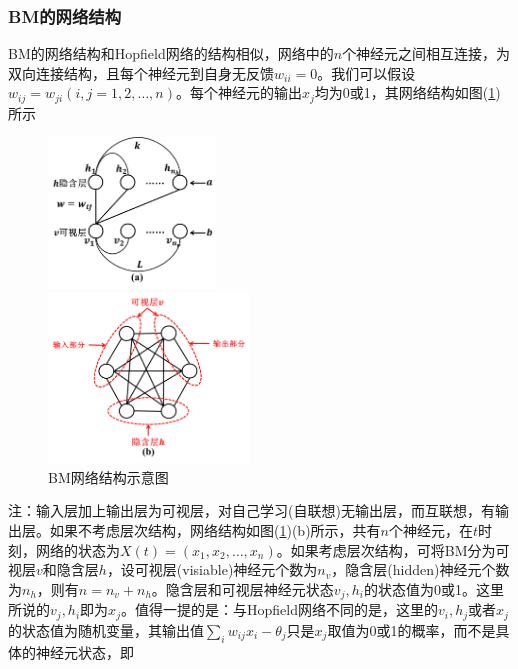 {        \subsubsection{BM的网络结构}
            \par
            BM的网络结构和Hopfield网络的结构相似，网络中的$n$个神经元之间相互连接，为双向连接结构，且每个神经元到自身无反馈$w_{ii} = 0$。我们可以假设$w_{ij} = w_{ji}(i,j=1,2,\dots,n)$。每个神经元的输出$x_j$均为0或1，其网络结构如图(\ref{fig:BM网络结构示意图})所示
			\begin{figure}[H]
  			\centering
  			\begin{varwidth}[t]{\textwidth}
    			\vspace{0pt}
    			\includegraphics[height=4cm]{images/BM_network_structure1.jpg}
  			\end{varwidth}
  			\qquad
  			\begin{varwidth}[t]{\textwidth}
    			\vspace{0pt}
    			\includegraphics[height=4.5cm]{images/BM_network_structure2.jpg}
  			\end{varwidth}
            \caption{BM网络结构示意图}
            \label{fig:BM网络结构示意图}
            \end{figure}
            注：输入层加上输出层为可视层，对自己学习(自联想)无输出层，而互联想，有输出层。如果不考虑层次结构，网络结构如图(\ref{fig:BM网络结构示意图})(b)所示，共有$n$个神经元，在$t$时刻，网络的状态为$X(t) = (x_1,x_2,\dots,x_n)$。如果考虑层次结构，可将BM分为可视层$v$和隐含层$h$，设可视层(visiable)神经元个数为$n_v$，隐含层(hidden)神经元个数为$n_h$，则有$n = n_v+n_h$。隐含层和可视层神经元状态$v_j,h_i$的状态值为0或1。这里所说的$v_j,h_i$即为$x_j$。值得一提的是：与Hopfield网络不同的是，这里的$v_i,h_j$或者$x_j$的状态值为随机变量，其输出值$\sum_i w_{ij}x_i - \theta_j$只是$x_j$取值为0或1的概率，而不是具体的神经元状态，即
}
